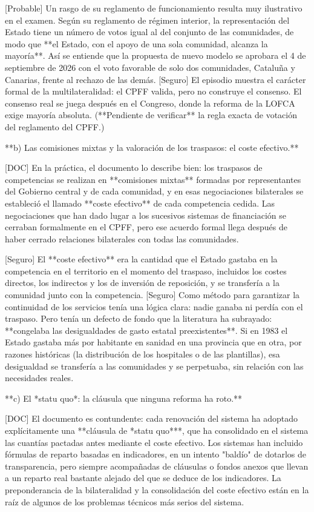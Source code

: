 \documentclass[10pt,a4paper]{article}
\newcounter{anexo}
\begin{document}
[Probable] Un rasgo de su reglamento de funcionamiento resulta muy ilustrativo en el examen. Según su reglamento de régimen interior, la representación del Estado tiene un número de votos igual al del conjunto de las comunidades, de modo que **el Estado, con el apoyo de una sola comunidad, alcanza la mayoría**. Así se entiende que la propuesta de nuevo modelo se aprobara el 4 de septiembre de 2026 con el voto favorable de solo dos comunidades, Cataluña y Canarias, frente al rechazo de las demás. [Seguro] El episodio muestra el carácter formal de la multilateralidad: el CPFF valida, pero no construye el consenso. El consenso real se juega después en el Congreso, donde la reforma de la LOFCA exige mayoría absoluta. (**Pendiente de verificar** la regla exacta de votación del reglamento del CPFF.)

**b) Las comisiones mixtas y la valoración de los traspasos: el coste efectivo.**

[DOC] En la práctica, el documento lo describe bien: los traspasos de competencias se realizan en **comisiones mixtas** formadas por representantes del Gobierno central y de cada comunidad, y en esas negociaciones bilaterales se estableció el llamado **coste efectivo** de cada competencia cedida. Las negociaciones que han dado lugar a los sucesivos sistemas de financiación se cerraban formalmente en el CPFF, pero ese acuerdo formal llega después de haber cerrado relaciones bilaterales con todas las comunidades.

[Seguro] El **coste efectivo** era la cantidad que el Estado gastaba en la competencia en el territorio en el momento del traspaso, incluidos los costes directos, los indirectos y los de inversión de reposición, y se transfería a la comunidad junto con la competencia. [Seguro] Como método para garantizar la continuidad de los servicios tenía una lógica clara: nadie ganaba ni perdía con el traspaso. Pero tenía un defecto de fondo que la literatura ha subrayado: **congelaba las desigualdades de gasto estatal preexistentes**. Si en 1983 el Estado gastaba más por habitante en sanidad en una provincia que en otra, por razones históricas (la distribución de los hospitales o de las plantillas), esa desigualdad se transfería a las comunidades y se perpetuaba, sin relación con las necesidades reales.

**c) El *statu quo*: la cláusula que ninguna reforma ha roto.**

[DOC] El documento es contundente: cada renovación del sistema ha adoptado explícitamente una **cláusula de *statu quo***, que ha consolidado en el sistema las cuantías pactadas antes mediante el coste efectivo. Los sistemas han incluido fórmulas de reparto basadas en indicadores, en un intento "baldío" de dotarlos de transparencia, pero siempre acompañadas de cláusulas o fondos anexos que llevan a un reparto real bastante alejado del que se deduce de los indicadores. La preponderancia de la bilateralidad y la consolidación del coste efectivo están en la raíz de algunos de los problemas técnicos más serios del sistema.
\end{document}
